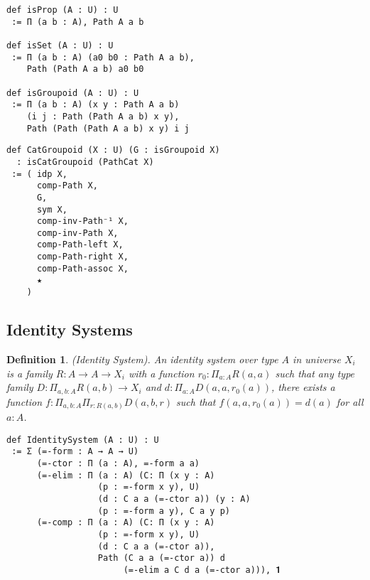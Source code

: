 \documentclass{article}
\newtheorem{definition}{Definition}
\begin{document}
\newpage
\begin{lstlisting}
def isProp (A : U) : U
 := Π (a b : A), Path A a b

def isSet (A : U) : U
 := Π (a b : A) (a0 b0 : Path A a b),
    Path (Path A a b) a0 b0

def isGroupoid (A : U) : U
 := Π (a b : A) (x y : Path A a b)
    (i j : Path (Path A a b) x y),
    Path (Path (Path A a b) x y) i j
\end{lstlisting}

\begin{lstlisting}
def CatGroupoid (X : U) (G : isGroupoid X)
  : isCatGroupoid (PathCat X)
 := ( idp X,
      comp-Path X,
      G,
      sym X,
      comp-inv-Path⁻¹ X,
      comp-inv-Path X,
      comp-Path-left X,
      comp-Path-right X,
      comp-Path-assoc X,
      ★
    )
\end{lstlisting}

\newpage
\subsection{Identity Systems}
\begin{definition} (Identity System).
An identity system over type $A$ in universe $X_i$ is a
family $R : A \rightarrow A \rightarrow X_i$ with a function
$r_0: \Pi_{a:A}R(a,a)$ such that any type family
$D : \Pi_{a,b:A}R(a,b) \rightarrow X_i$ and
$d: \Pi_{a:A}D(a,a,r_0(a))$, there exists a function
$f: \Pi_{a,b:A}\Pi_{r:R(a,b)}D(a,b,r)$ such that
$f(a,a,r_0(a))=d(a)$ for all $a:A$.
\begin{lstlisting}
def IdentitySystem (A : U) : U
 := Σ (=-form : A → A → U)
      (=-ctor : Π (a : A), =-form a a)
      (=-elim : Π (a : A) (C: Π (x y : A)
                  (p : =-form x y), U)
                  (d : C a a (=-ctor a)) (y : A)
                  (p : =-form a y), C a y p)
      (=-comp : Π (a : A) (C: Π (x y : A)
                  (p : =-form x y), U)
                  (d : C a a (=-ctor a)),
                  Path (C a a (=-ctor a)) d
                       (=-elim a C d a (=-ctor a))), 𝟏
\end{lstlisting}
\end{definition}
\end{document}
